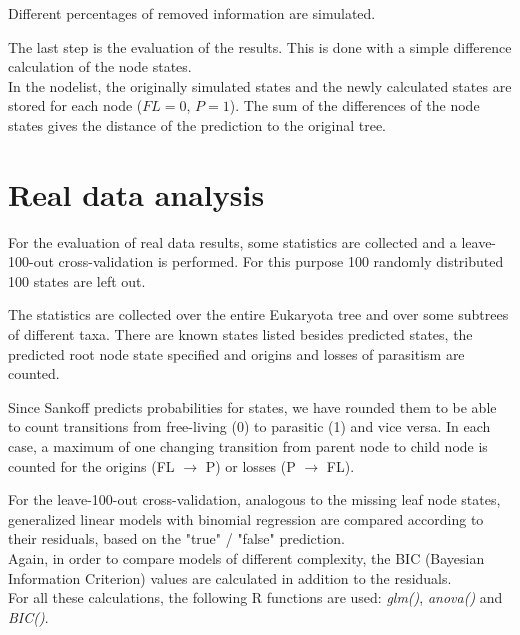     Different percentages of removed information are simulated.
  
    The last step is the evaluation of the results. This is done with a simple difference calculation 
      of the node states. \\
    In the nodelist, the originally simulated states and the newly calculated states are stored for 
      each node ($FL = 0$, $P = 1$). The sum of the differences of the node states gives the distance 
      of the prediction to the original tree.

  \section{Real data analysis} \label{sec:methods - real data analysis}
    For the evaluation of real data results, some statistics are collected and a leave-100-out 
      cross-validation is performed. For this purpose 100 randomly distributed 100 states are left out.

    The statistics are collected over the entire Eukaryota tree and over some subtrees of different 
      taxa. There are known states listed besides predicted states, the predicted root node state 
      specified and origins and losses of parasitism are counted.

    Since Sankoff predicts probabilities for states, we have rounded them to be able to count 
      transitions from free-living (0) to parasitic (1) and vice versa. In each case, a maximum of one 
      changing transition from parent node to child node is counted for the origins (FL $\rightarrow$ 
      P) or losses (P $\rightarrow$ FL).
    
    For the leave-100-out cross-validation, analogous to the missing leaf node states, generalized 
      linear models with binomial regression are compared according to their residuals, based on the 
      "true" / "false" prediction. \\
    Again, in order to compare models of different complexity, the BIC (Bayesian Information Criterion) 
      values are calculated in addition to the residuals. \\
    For all these calculations, the following R functions are used: \textit{glm()}, \textit{anova()} 
      and \textit{BIC()}. \\

